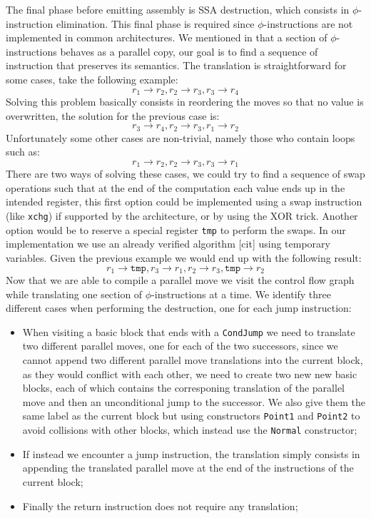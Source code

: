 The final phase before emitting assembly is SSA destruction, which consists in $\phi$-instruction elimination. This final phase is required since $\phi$-instructions are not implemented in common architectures.
We mentioned in  that a section of $\phi$-instructions behaves as a parallel copy, our goal is to find a sequence of instruction that preserves its semantics. The translation is straightforward for some cases, take the following example:
\[
  r_1 \to r_2, r_2 \to r_3, r_3 \to r_4
\]
Solving this problem basically consists in reordering the moves so that no value is overwritten, the solution for the previous case is:
\[
  r_3 \to r_4, r_2 \to r_3, r_1 \to r_2
\]
Unfortunately some other cases are non-trivial, namely those who contain loops such as:
\[
  r_1 \to r_2, r_2 \to r_3, r_3 \to r_1
\]
There are two ways of solving these cases, we could try to find a sequence of swap operations such that at the end of the computation each value ends up in the intended register, this first option could be implemented using a swap instruction (like \texttt{xchg}) if supported by the architecture, or by using the XOR trick. Another option would be to reserve a special register \texttt{tmp} to perform the swaps. In our implementation we use an already verified algorithm [cit] using temporary variables. Given the previous example we would end up with the following result:
\[
  r_1 \to \texttt{tmp}, r_3 \to r_1, r_2 \to r_3, \texttt{tmp} \to r_2
\]
Now that we are able to compile a parallel move we visit the control flow graph while translating one section of $\phi$-instructions at a time.
We identify three different cases when performing the destruction, one for each jump instruction:
\begin{itemize}
  \item When visiting a basic block that ends with a \texttt{CondJump} we need to translate two different parallel moves, one for each of the two successors, since we cannot append two different parallel move translations into the current block, as they would conflict with each other, we need to create two new new basic blocks, each of which contains the corresponing translation of the parallel move and then an unconditional jump to the successor. We also give them the same label as the current block but using constructors \texttt{Point1} and \texttt{Point2} to avoid collisions with other blocks, which instead use the \texttt{Normal} constructor;
  \item If instead we encounter a jump instruction, the translation simply consists in appending the translated parallel move at the end of the instructions of the current block;
  \item Finally the return instruction does not require any translation;
\end{itemize}

